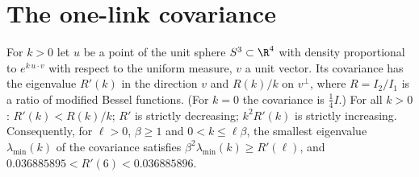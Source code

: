 \section{The one-link covariance}\label{s:haar}
\begin{proposition}\label{p:haar}
For $k>0$ let $u$ be a point of the unit sphere $S^3\subset\R^4$ with density proportional to
$e^{k\,u\cdot v}$ with respect to the uniform measure, $v$ a unit vector. Its covariance has the eigenvalue
$R'(k)$ in the direction $v$ and $R(k)/k$ on $v^\perp$, where $R=I_2/I_1$ is a ratio of modified Bessel
functions. (For $k=0$ the covariance is $\tfrac14I$.) For all $k>0$: $R'(k)<R(k)/k$; $R'$ is strictly decreasing;
$k^2R'(k)$ is strictly increasing.
Consequently, for $\ell>0$, $\beta\ge1$ and $0<k\le\ell\beta$, the smallest eigenvalue $\lambda_{\min}(k)$ of the
covariance satisfies $\beta^2\lambda_{\min}(k)\ge R'(\ell)$, and $0.036885895<R'(6)<0.036885896$.
\end{proposition}

